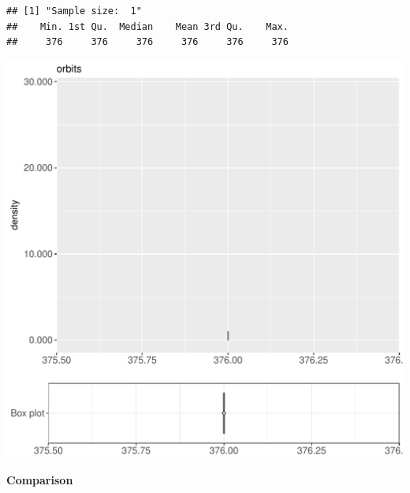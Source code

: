 \documentclass{article}\usepackage[]{graphicx}\usepackage[]{color}
\makeatletter
\def\maxwidth{ %
  \ifdim\Gin@nat@width>\linewidth
    \linewidth
  \else
    \Gin@nat@width
  \fi
}
\newenvironment{kframe}{%
 \def\at@end@of@kframe{}%
 \ifinner\ifhmode%
  \def\at@end@of@kframe{\end{minipage}}%
  \begin{minipage}{\columnwidth}%
 \fi\fi%
 \def\FrameCommand##1{\hskip\@totalleftmargin \hskip-\fboxsep
 \colorbox{shadecolor}{##1}\hskip-\fboxsep
     \hskip-\linewidth \hskip-\@totalleftmargin \hskip\columnwidth}%
 \MakeFramed {\advance\hsize-\width
   \@totalleftmargin\z@ \linewidth\hsize
   \@setminipage}}%
 {\par\unskip\endMakeFramed%
 \at@end@of@kframe}
\newenvironment{knitrout}{}{} %
\makeatother
\begin{document}
\begin{knitrout}
\color{fgcolor}\begin{kframe}
\begin{verbatim}
## [1] "Sample size:  1"
##    Min. 1st Qu.  Median    Mean 3rd Qu.    Max. 
##     376     376     376     376     376     376
\end{verbatim}


{\ttfamily\noindent\bfseries{}}\end{kframe}
\includegraphics[width=\maxwidth]{figure/RH5_cashewExceptOrder_small-1} 

\end{knitrout}
  
 \textbf{Comparison}
  
\end{document}

